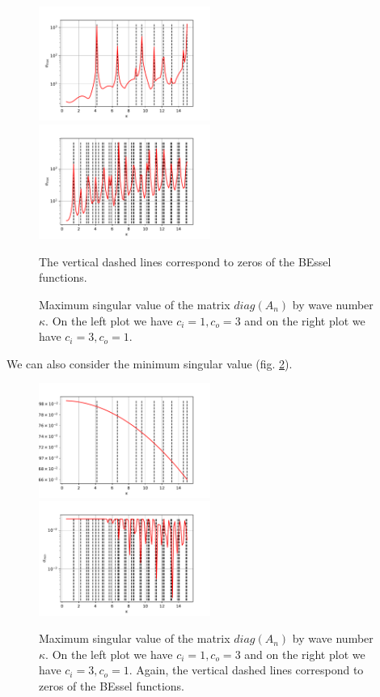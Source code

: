 \documentclass[10pt,journal,compsoc, onecolumn]{IEEEtran}
\begin{document}
\begin{figure}
    \includegraphics[width=0.5\textwidth]{scenario1MaximumSingVal.pdf}
    \includegraphics[width=0.5\textwidth]{scenario2MaximumSingVal.pdf}
    \caption{Maximum singular value of the matrix $diag(A_n)$ by wave number $\kappa$. 
    On the left plot we have $c_i = 1, c_o = 3$ 
    and on the right plot we have $c_i = 3, c_o = 1.$} The vertical dashed lines correspond to zeros of the BEssel functions. 
   \label{fig:max_sing_val}
\end{figure}
We can also consider the minimum singular value (fig. \ref{fig:min_sing_val}).
\begin{figure}
    \includegraphics[width=0.5\textwidth]{scenario1MinimumSingVal.pdf}
    \includegraphics[width=0.5\textwidth]{scenario2MinimumSingVal.pdf}
    \caption{Maximum singular value of the matrix $diag(A_n)$ by wave number $\kappa$. 
    On the left plot we have $c_i = 1, c_o = 3$ 
    and on the right plot we have $c_i = 3, c_o = 1.$ Again, the vertical dashed lines correspond to zeros of the BEssel functions. }
   \label{fig:min_sing_val}
\end{figure}
\end{document}
